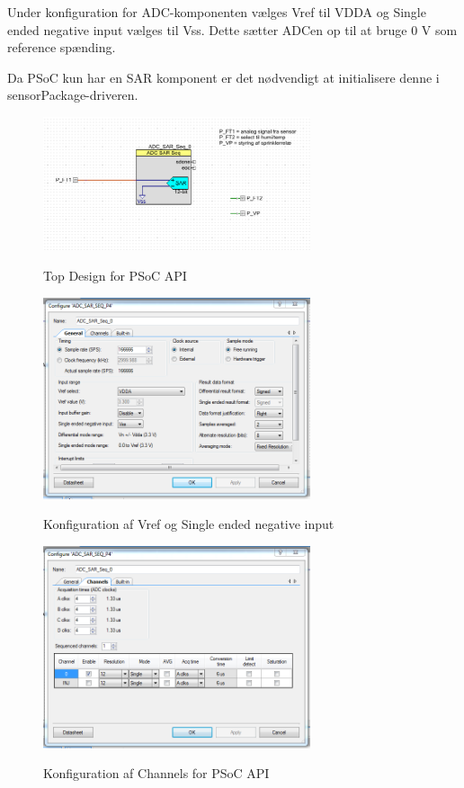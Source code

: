 Under konfiguration for ADC-komponenten vælges Vref til VDDA og Single ended negative input vælges til Vss. Dette sætter ADCen op til at bruge 0 V som reference spænding.

Da PSoC kun har en SAR komponent er det nødvendigt at initialisere denne i sensorPackage-driveren.

\begin{figure}[htb]
\centering
{\includegraphics[width=0.70\textwidth]{filer/pics/psoc_api_topdesign.png}}
\caption{Top Design for PSoC API}
\label{lab:psoc_api_topdesign}
\end{figure}

\begin{figure}[htb]
\centering
{\includegraphics[width=0.70\textwidth]{filer/pics/psoc_api_config1.png}}
\caption{Konfiguration af Vref og Single ended negative input}
\label{lab:psoc_api_config1}
\end{figure}

\begin{figure}[htb]
\centering
{\includegraphics[width=0.70\textwidth]{filer/pics/psoc_api_config2.png}}
\caption{Konfiguration af Channels for PSoC API}
\label{lab:psoc_api_config2}
\end{figure}